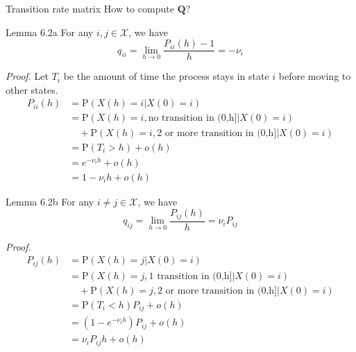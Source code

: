 \documentclass[letterpaper,handout, mathserif]{beamer}
\def\Sum{\sum\nolimits}
\def\p{\mathrm P}
\def\X{\mathcal{X}}
\begin{document}
\begin{frame}{Transition rate matrix}
\vfill
\large How to compute $\mathbf{Q}$?
\vfill
\end{frame}
\begin{frame}{Lemma 6.2a}
For any $i,j\in\X$, we have
$$q_{ii} = \lim_{h\to 0}\frac{P_{ii}(h) - 1}{h} = -\nu_i$$

{\em Proof.}
Let $T_i$ be the amount of time the process stays in state $i$ before moving to other states.
\begin{align*}
P_{ii}(h)&=\p(X(h)=i|X(0) = i)\\
&=\p(X(h)=i,\mbox{no transition in (0,h]}|X(0) = i)\\
&\quad+\p(X(h)=i,\mbox{2 or more transition in (0,h]}|X(0) = i)\\
&=\p(T_i>h)+o(h)\\
&=e^{-\nu_ih}+o(h)\\
&=1-\nu_i h+o(h)
\end{align*}\vspace{-30pt}

\end{frame}
\begin{frame}{Lemma 6.2b}
For any $i \neq j\in\X$, we have
$$q_{ij} = \lim_{h\to 0}\frac{P_{ij}(h)}{h}=\nu_iP_{ij}$$
\par\medskip

{\em Proof.}
\begin{align*}
P_{ij}(h)&=\p(X(h)=j|X(0) = i)\\
&=\p(X(h)=j,\mbox{1 transition in (0,h]}|X(0) = i)\\
&\quad+\p(X(h)=j,\mbox{2 or more transition in (0,h]}|X(0) = i)\\
&=\p(T_i<h)P_{ij}+o(h)\\
&=(1\!-\!e^{-\nu_ih})P_{ij}+o(h)\\
&=\nu_iP_{ij}h+o(h)
\end{align*}
\end{frame}
\end{document}

